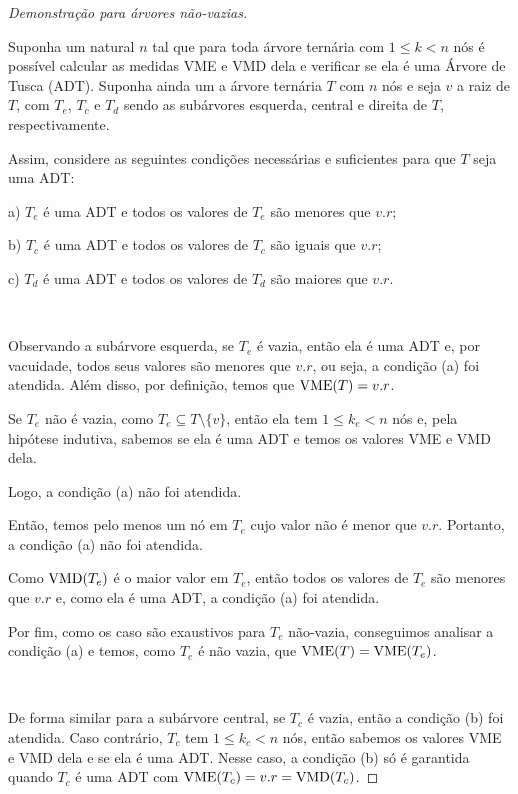\begin{proof}[Demonstração para árvores não-vazias]\resetCasos~

    Suponha um natural $n$ tal que para toda árvore ternária com $1 \leq k < n$ nós é possível calcular as medidas VME e VMD dela e verificar se ela é uma Árvore de Tusca (ADT). Suponha ainda um a árvore ternária $T$ com $n$ nós e seja $v$ a raiz de $T$, com $T_e$, $T_c$ e $T_d$ sendo as subárvores esquerda, central e direita de $T$, respectivamente.

    Assim, considere as seguintes condições necessárias e suficientes para que $T$ seja uma ADT:

        a) $T_e$ é uma ADT e todos os valores de $T_e$ são menores que $v.r$;

        b) $T_c$ é uma ADT e todos os valores de $T_c$ são iguais que $v.r$;

        c) $T_d$ é uma ADT e todos os valores de $T_d$ são maiores que $v.r$.

    ~

    Observando a subárvore esquerda, se $T_e$ é vazia, então ela é uma ADT e, por vacuidade, todos seus valores são menores que $v.r$, ou seja, a condição (a) foi atendida. Além disso, por definição, temos que $\operatorname{VME}(T) = v.r$.

    Se $T_e$ não é vazia, como $T_e \subseteq T \setminus \{v\}$, então ela tem $1 \leq k_e < n$ nós e, pela hipótese indutiva, sabemos se ela é uma ADT e temos os valores VME e VMD dela.
    \begin{case}
        Logo, a condição (a) não foi atendida.
    \end{case}
    \begin{case}
        Então, temos pelo menos um nó em $T_e$ cujo valor não é menor que $v.r$. Portanto, a condição (a) não foi atendida.
    \end{case}
    \begin{case}
        Como $\operatorname{VMD}(T_e)$ é o maior valor em $T_e$, então todos os valores de $T_e$ são menores que $v.r$ e, como ela é uma ADT, a condição (a) foi atendida.
    \end{case}
    Por fim, como os caso são exaustivos para $T_e$ não-vazia, conseguimos analisar a condição (a) e temos, como $T_e$ é não vazia, que $\operatorname{VME}(T) = \operatorname{VME}(T_e)$.

    ~

    De forma similar para a subárvore central, se $T_c$ é vazia, então a condição (b) foi atendida. Caso contrário, $T_c$ tem $1 \leq k_c < n$ nós, então sabemos os valores VME e VMD dela e se ela é uma ADT. Nesse caso, a condição (b) só é garantida quando $T_c$ é uma ADT com $\operatorname{VME}(T_c) = v.r = \operatorname{VMD}(T_c)$.


\end{proof}
